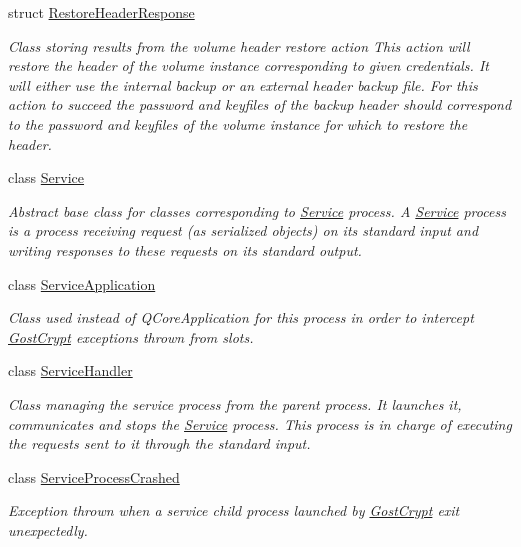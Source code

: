 \begin{DoxyCompactItemize}
struct \hyperlink{struct_gost_crypt_1_1_core_1_1_restore_header_response}{Restore\+Header\+Response}
\begin{DoxyCompactList}\small\item\em Class storing results from the volume header restore action This action will restore the header of the volume instance corresponding to given credentials. It will either use the internal backup or an external header backup file. For this action to succeed the password and keyfiles of the backup header should correspond to the password and keyfiles of the volume instance for which to restore the header. \end{DoxyCompactList}\item 
class \hyperlink{class_gost_crypt_1_1_core_1_1_service}{Service}
\begin{DoxyCompactList}\small\item\em Abstract base class for classes corresponding to \hyperlink{class_gost_crypt_1_1_core_1_1_service}{Service} process. A \hyperlink{class_gost_crypt_1_1_core_1_1_service}{Service} process is a process receiving request (as serialized objects) on its standard input and writing responses to these requests on its standard output. \end{DoxyCompactList}\item 
class \hyperlink{class_gost_crypt_1_1_core_1_1_service_application}{Service\+Application}
\begin{DoxyCompactList}\small\item\em Class used instead of Q\+Core\+Application for this process in order to intercept \hyperlink{namespace_gost_crypt}{Gost\+Crypt} exceptions thrown from slots. \end{DoxyCompactList}\item 
class \hyperlink{class_gost_crypt_1_1_core_1_1_service_handler}{Service\+Handler}
\begin{DoxyCompactList}\small\item\em Class managing the service process from the parent process. It launches it, communicates and stops the \hyperlink{class_gost_crypt_1_1_core_1_1_service}{Service} process. This process is in charge of executing the requests sent to it through the standard input. \end{DoxyCompactList}\item 
class \hyperlink{class_gost_crypt_1_1_core_1_1_service_process_crashed}{Service\+Process\+Crashed}
\begin{DoxyCompactList}\small\item\em Exception thrown when a service child process launched by \hyperlink{namespace_gost_crypt}{Gost\+Crypt} exit unexpectedly. \end{DoxyCompactList}\item 

\end{DoxyCompactItemize}
